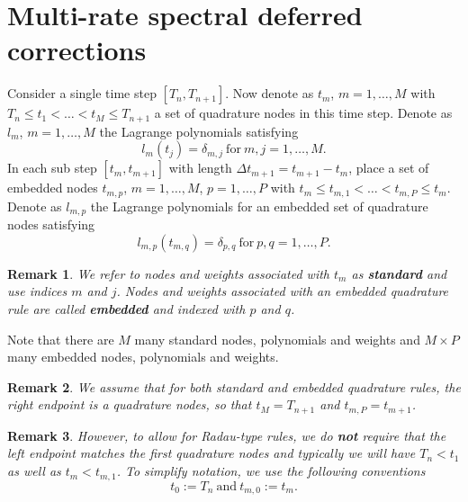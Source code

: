 \documentclass{article}
\newtheorem{remark}{Remark}
\begin{document}
\section*{Multi-rate spectral deferred corrections}
Consider a single time step $[T_{n}, T_{n+1}]$.
Now denote as $t_m$, $m=1, \ldots, M$ with $T_{n} \leq t_1 < \ldots < t_{M} \leq T_{n+1}$ a set of quadrature nodes in this time step.
Denote as $l_m$, $m=1, \ldots, M$ the Lagrange polynomials satisfying 
\begin{equation}
	l_m(t_j) = \delta_{m,j} \ \text{for} \ m,j=1, \ldots, M.
\end{equation}
In each sub step $[t_m, t_{m+1}]$ with length $\Delta t_{m+1}=t_{m+1}-t_m$, place a set of embedded nodes $t_{m,p}$, $m=1,\ldots,M$, $p=1,\ldots,P$ with $t_{m} \leq t_{m,1} < \ldots < t_{m,P} \leq t_{m}$.
Denote as $l_{m,p}$ the Lagrange polynomials for an embedded set of quadrature nodes satisfying
\begin{equation}
	l_{m,p}(t_{m,q}) = \delta_{p,q} \ \text{for} \ p,q=1,\ldots,P.
\end{equation}
\begin{remark}
We refer to nodes and weights associated with $t_m$ as \textbf{standard} and use indices $m$ and $j$.
Nodes and weights associated with an embedded quadrature rule are called \textbf{embedded} and indexed with $p$ and $q$.
\end{remark}
Note that there are $M$ many standard nodes, polynomials and weights and $M \times P$ many embedded nodes, polynomials and weights.
\begin{remark}
We assume that for both standard and embedded quadrature rules, the right endpoint is a quadrature nodes, so that $t_{M} = T_{n+1}$ and $t_{m,P} = t_{m+1}$.
\end{remark}
\begin{remark}
However, to allow for Radau-type rules, we do \textbf{not} require that the left endpoint matches the first quadrature nodes and typically we will have $T_n < t_1$ as well as $t_{m} < t_{m,1}$.
To simplify notation, we use the following conventions
\begin{equation}
	t_0 := T_n \ \text{and} \ t_{m,0} := t_{m}.
\end{equation}
\end{remark}
\end{document}

